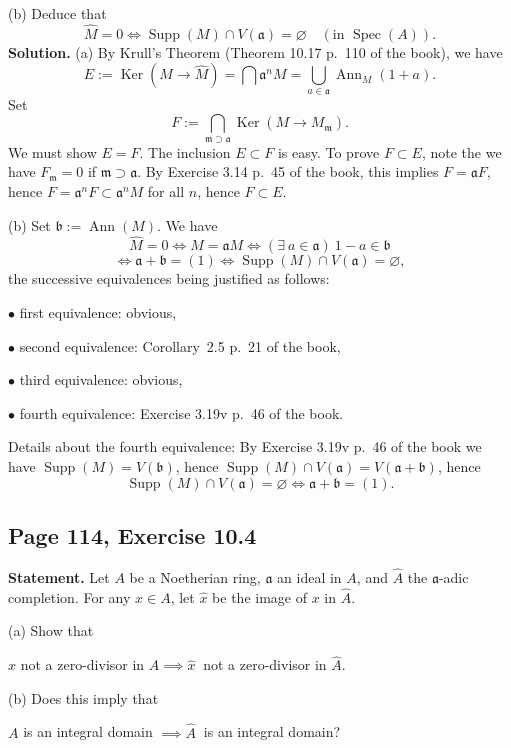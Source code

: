 \documentclass[parskip=half,fontsize=12pt]{scrartcl}%
\newcommand{\oo}{\operatorname}\newcommand{\ooo}{\operatorname*}
\newcommand{\mf}{\mathfrak}
\newcommand{\aaa}{\mf a}
\newcommand{\bbb}{\mf b}
\newcommand{\mmm}{\mf m}
\newcommand{\bu}{\bullet}
\newcommand{\Ker}{\operatorname{Ker}}\newcommand{\Coker}{\operatorname{Coker}}
\newcommand{\Spec}{\operatorname{Spec}}\newcommand{\Sp}{\operatorname{Spec}}
\begin{document}
(b) Deduce that
$$
\widehat M=0\iff\oo{Supp}(M)\cap V(\aaa)=\varnothing\quad(\text{in }\Spec(A)).
$$
\textbf{Solution.} (a) By Krull's Theorem (Theorem 10.17 p.~110 of the book), we have 
$$
E:=\Ker(M\to\widehat M)=\bigcap\aaa^nM=\bigcup_{a\in\aaa}\oo{Ann}_M(1+a). 
$$ 
Set 
$$
F:=\bigcap_{\mmm\supset\aaa}\Ker(M\to M_\mmm). 
$$ 
We must show $E=F$. The inclusion $E\subset F$ is easy. To prove $F\subset E$, note the we have $F_\mmm=0$ if $\mmm\supset\aaa$. By Exercise 3.14 p.~45 of the book, this implies $F=\aaa F$, hence $F=\aaa^nF\subset\aaa^nM$ for all $n$, hence $F\subset E$. 

(b) Set $\bbb:=\oo{Ann}(M)$. We have 
$$
\widehat M=0\iff M=\aaa M\iff(\exists\ a\in\aaa)\ 1-a\in\bbb
$$ 
$$
\iff\aaa+\bbb=(1)\iff\oo{Supp}(M)\cap V(\aaa)=\varnothing,
$$ 
the successive equivalences being justified as follows:

$\bu$ first equivalence: obvious, %

$\bu$ second equivalence: Corollary~2.5 p.~21 of the book,

$\bu$ third equivalence: obvious,

$\bu$ fourth equivalence: Exercise 3.19v p.~46 of the book. 

Details about the fourth equivalence: By Exercise 3.19v p.~46 of the book we have $\oo{Supp}(M)=V(\bbb)$, hence $\oo{Supp}(M)\cap V(\aaa)=V(\aaa+\bbb)$, hence 
$$
\oo{Supp}(M)\cap V(\aaa)=\varnothing\iff\aaa+\bbb=(1).
$$ 

\subsection{Page 114, Exercise 10.4}%

\textbf{Statement.} Let $A$ be a Noetherian ring, $\aaa$ an ideal in $A$, and $\widehat A$ the $\aaa$-adic completion. For any $x\in A$, let $\widehat x$ be the image of $x$ in $\widehat A$. 

(a) Show that\smallskip 

\centerline{$x$ not a zero-divisor in $A\implies\widehat x\ $ not a zero-divisor in $\widehat A$.} 

(b) Does this imply that\smallskip 

\centerline{$A$ is an integral domain $\implies\widehat A\ $ is an integral domain?}
\end{document}
